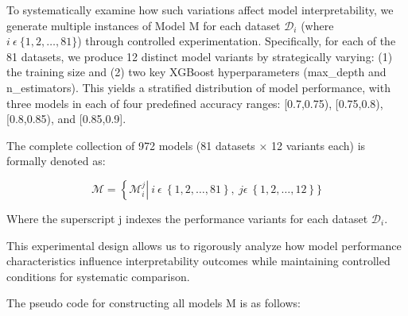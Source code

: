 \documentclass{article}
\begin{document}
To systematically examine how such variations affect model interpretability, we generate multiple instances of Model M for each dataset $\mathcal{D}_{i}$ (where $i\ \epsilon\ \{ 1,2,\ldots,81\}$) through controlled experimentation. Specifically, for each of the 81 datasets, we produce 12 distinct model variants by strategically varying: (1) the training size and (2) two key XGBoost hyperparameters (max\_depth and n\_estimators). This yields a stratified distribution of model performance, with three models in each of four predefined accuracy ranges: [0.7,0.75), [0.75,0.8), [0.8,0.85), and [0.85,0.9].

The complete collection of 972 models (81 datasets × 12 variants each) is formally denoted as:

$$\mathcal{M =}\left\{ \mathcal{M}_{i}^{j} \right|\ i\ \epsilon\ \left\{ 1,2,\ldots,81 \right\},\ j\epsilon\ \left\{ 1,2,\ldots,12 \right\}\}$$

Where the superscript j indexes the performance variants for each dataset $\mathcal{D}_{i}$.

This experimental design allows us to rigorously analyze how model performance characteristics influence interpretability outcomes while maintaining controlled conditions for systematic comparison.

The pseudo code for constructing all models M is as follows:
\end{document}
